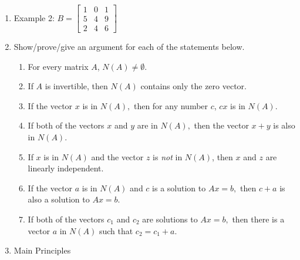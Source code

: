 \documentclass[11pt,fleqn]{article}
\newcommand{\bbm}{\begin{bmatrix}}
\newcommand{\ebm}{\end{bmatrix}}
\begin{document}
\begin{enumerate}
\item Example 2: $B=\bbm 1&0&1 \\ 5&4&9\\ 2&4&6 \ebm$\\
\vfill
\newpage
\item Show/prove/give an argument for each of the statements below.\\
	\begin{enumerate}
	\item For every matrix $A$, $N(A) \not = \emptyset.$
	\vspace{.5in}
	\item If $A$ is invertible, then $N(A)$ contains only the zero vector.\\
	\vspace{.5in}
	\item If the vector $x$ is in $N(A),$ then for any number $c$, $cx$ is in $N(A)$.\\
	\vfill
	\item If both of the vectors $x$ and $y$ are in $N(A),$ then the vector $x+y$ is also in $N(A).$\\
	\vfill
	\item If $x$ is in $N(A)$ and the vector $z$ is \emph{not} in $N(A)$, then $x$ and $z$ are linearly independent.
	\vfill
	\item If the vector $a$ is in $N(A)$ and $c$ is a solution to $Ax=b,$ then $c+a$ is also a solution to $Ax=b.$
	\vfill
	\item If both of the vectors $c_1$ and $c_2$ are solutions to $Ax=b,$ then there is a vector $a$ in $N(A)$ such that $c_2=c_1+a.$
	\vfill
	\end{enumerate}
\newpage
\item Main Principles
\end{enumerate}
\end{document}
